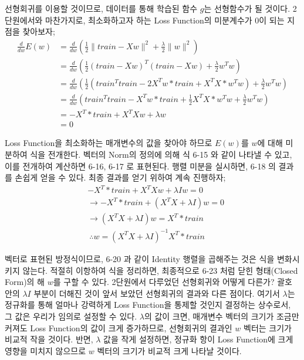 \documentclass[a4paper]{oblivoir}
\begin{document}
선형회귀를 이용할 것이므로, 데이터를 통해 학습된 함수 $g$는 선형함수가 될 것이다. 2단원에서와 마찬가지로, 최소화하고자 하는 Loss Function의 미분계수가 0이 되는 지점을 찾아보자;
\begin{align}
\frac{d}{dw}E(w) &=\frac{d}{dw}\left(\frac{1}{2}\| train - Xw \|^{2} + \frac{\lambda}{2}\|w \|^{2} \right) \tag{6-14}\\
&=\frac{d}{dw}\left(\frac{1}{2}(train - Xw)^{T}(train - Xw) + \frac{\lambda}{2}w^{T}w \right) \tag{6-15}\\
&=\frac{d}{dw}\left(\frac{1}{2}(train^{T}train - 2X^{T}w*train + X^{T}X*w^{T}w)+\frac{\lambda}{2}w^{T}w \right) \tag{6-16}\\
&=\frac{d}{dw}\left(train^{T}train - X^{T}w*train + \frac{1}{2}X^{T}X*w^{T}w + \frac{\lambda}{2}w^{T}w \right) \tag{6-17}\\
&=-X^{T}*train + X^{T}Xw + \lambda w \tag{6-18}\\
&=0 \tag{6-19}
\end{align}

\indent Loss Function을 최소화하는 매개변수의 값을 찾아야 하므로 $E(w)$를 $w$에 대해 미분하여 식을 전개한다. 벡터의 Norm의 정의에 의해 식 6-15 와 같이 나타낼 수 있고, 이를 전개하여 계산하면 6-16, 6-17 로 표현된다. 행렬 미분을 실시하면, 6-18 의 결과를 손쉽게 얻을 수 있다. 최종 결과를 얻기 위하여 계속 진행하자;
\begin{align}
&-X^{T}*train + X^{T}Xw + \lambda Iw = 0 \tag{6-20}\\
&\to -X^{T}*train + (X^{T}X + \lambda I)w = 0 \tag{6-21}\\
&\to (X^{T}X + \lambda I)w = X^{T}*train \tag{6-22}\\
&\: \therefore w = (X^{T}X + \lambda I)^{-1}X^{T}*train \tag{6-23}
\end{align}

\indent 벡터로 표현된 방정식이므로, 6-20 과 같이 Identity 행렬을 곱해주는 것은 식을 변화시키지 않는다. 적절히 이항하여 식을 정리하면, 최종적으로 6-23 처럼 닫힌 형태(Closed Form)의 해 $w$를 구할 수 있다. 2단원에서 다루었던 선형회귀와 어떻게 다른가? 괄호 안의 $\lambda I$ 부분이 더해진 것이 앞서 보았던 선형회귀의 결과와 다른 점이다. 여기서 $\lambda$는 정규화를 통해 얼마나 강력하게 Loss Function을 통제할 것인지 결정하는 상수로서, 그 값은 우리가 임의로 설정할 수 있다. $\lambda$의 값이 크면, 매개변수 벡터의 크기가 조금만 커져도 Loss Function의 값이 크게 증가하므로, 선형회귀의 결과인 $w$ 벡터는 크기가 비교적 작을 것이다. 반면, $\lambda$ 값을 작게 설정하면, 정규화 항이 Loss Function에 크게 영향을 미치지 않으므로 $w$ 벡터의 크기가 비교적 크게 나타날 것이다.
\end{document}
